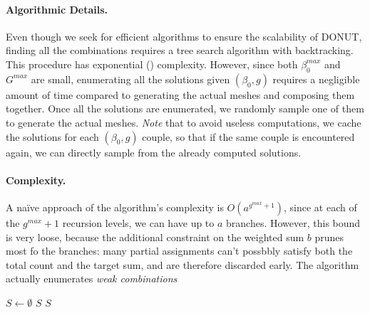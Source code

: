 \paragraph{Algorithmic Details.} 
Even though we seek for efficient algorithms to ensure the scalability of DONUT, finding all the combinations requires a tree search algorithm with backtracking. This procedure has exponential () complexity. However, since both $\beta_0^{max}$ and $G^{max}$ are small, enumerating all the solutions given $(\beta_0, g)$ requires a negligible amount of time compared to generating the actual meshes and composing them together. Once all the solutions are enumerated, we randomly sample one of them to generate the actual meshes. \textit{Note} that to avoid useless computations, we cache the solutions for each $(\beta_0, g)$ couple, so that if the same couple is encountered again, we can directly sample from the already computed solutions.

\paragraph{Complexity.}
A naïve approach of the algorithm's complexity is $O(a^{g^{max}+1})$, since at each of the $g^{max}+1$ recursion levels,  we can have up to $a$ branches. However, this bound is very loose, because the additional constraint on the weighted sum $b$ prunes most fo the branches: many partial assignments can't possbbly satisfy both the total count and the target sum, and are therefore discarded early. The algorithm actually enumerates \emph{weak combinations} \cite{counting} 

\begin{algorithm}
  \caption{\textsc{Enumerate-Solutions} \\
  \textbf{Input:} $a$, $b$, $g^{max}$ \\
  \textbf{Output:} $S$}
  \begin{algorithmic}[]
      \State $S \gets \emptyset$ 
          \State \Return $S$
      \EndIf
      \State {} 
      \State \Return $S$
  \end{algorithmic}
\end{algorithm}

